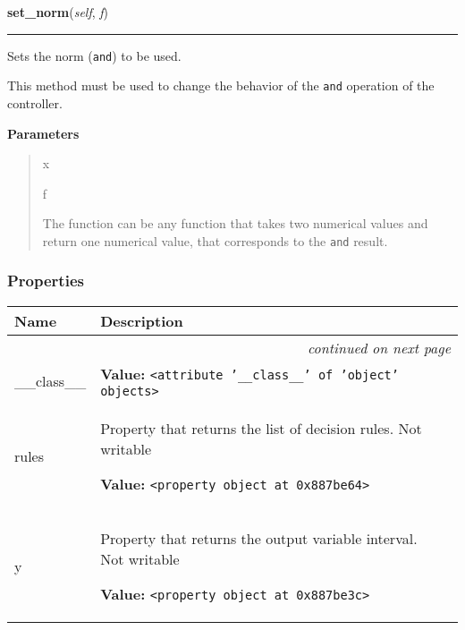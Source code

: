     \begin{boxedminipage}{\textwidth}

    \raggedright \textbf{set\_norm}(\textit{self}, \textit{f})

    \vspace{-1.5ex}

    \rule{\textwidth}{0.5\fboxrule}

Sets the norm (\texttt{and}) to be used.

This method must be used to change the behavior of the \texttt{and} operation
of the controller.
    \vspace{1ex}

      \textbf{Parameters}
      \begin{quote}
        \begin{Ventry}{x}

          \item[f]


The function can be any function that takes two numerical values and
return one numerical value, that corresponds to the \texttt{and} result.
        \end{Ventry}

      \end{quote}

    \vspace{1ex}

    \end{boxedminipage}



  \subsubsection{Properties}

\begin{longtable}{|p{}|p{}|l}
\cline{1-2}
\cline{1-2} \centering \textbf{Name} & \centering \textbf{Description}& \\
\cline{1-2}
\endhead\cline{1-2}\multicolumn{3}{r}{\small\textit{continued on next page}}\\\endfoot\cline{1-2}
\endlastfoot\raggedright \_\-\_\-c\-l\-a\-s\-s\-\_\-\_\- & \raggedright \textbf{Value:} 
{\tt {\textless}attribute '\_\_class\_\_' of 'object' objects{\textgreater}}&\\
\cline{1-2}
\raggedright r\-u\-l\-e\-s\- & \raggedright Property that returns the list of decision rules. Not writable

\textbf{Value:} 
{\tt {\textless}property object at 0x887be64{\textgreater}}&\\
\cline{1-2}
\raggedright y\- & \raggedright Property that returns the output variable interval. Not writable

\textbf{Value:} 
{\tt {\textless}property object at 0x887be3c{\textgreater}}&\\
\cline{1-2}
\end{longtable}

